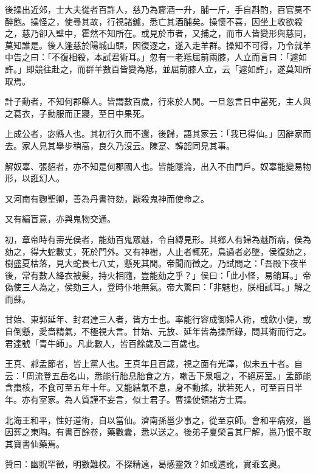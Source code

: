 \begin{pinyinscope}
後操出近郊，士大夫從者百許人，慈乃為齎酒一升，脯一斤，手自斟酌，百官莫不醉飽。操怪之，使尋其故，行視諸鑪，悉亡其酒脯矣。操懷不喜，因坐上收欲殺之，慈乃卻入壁中，霍然不知所在。或見於市者，又捕之，而市人皆變形與慈同，莫知誰是。後人逢慈於陽城山頭，因復逐之，遂入走羊群。操知不可得，乃令就羊中告之曰：「不復相殺，本試君術耳。」忽有一老羝屈前兩膝，人立而言曰：「遽如許。」即競往赴之，而群羊數百皆變為羝，並屈前膝人立，云「遽如許」，遂莫知所取焉。

計子勳者，不知何郡縣人。皆謂數百歲，行來於人閒。一旦忽言日中當死，主人與之葛衣，子勳服而正寢，至日中果死。

上成公者，宓縣人也。其初行久而不還，後歸，語其家云：「我已得仙。」因辭家而去。家人見其舉步稍高，良久乃沒云。陳寔、韓韶同見其事。

解奴辜、張貂者，亦不知是何郡國人也。皆能隱淪，出入不由門戶。奴辜能變易物形，以誑幻人。

又河南有麴聖卿，善為丹書符劾，厭殺鬼神而使命之。

又有編盲意，亦與鬼物交通。

初，章帝時有壽光侯者，能劾百鬼眾魅，令自縛見形。其鄉人有婦為魅所病，侯為劾之，得大蛇數丈，死於門外。又有神樹，人止者輒死，鳥過者必墜，侯復劾之，樹盛夏枯落，見大蛇長七八丈，懸死其閒。帝聞而徵之。乃試問之：「吾殿下夜半後，常有數人絳衣被髮，持火相隨，豈能劾之乎？」侯曰：「此小怪，易銷耳。」帝偽使三人為之，侯劾三人，登時仆地無氣。帝大驚曰：「非魅也，朕相試耳。」解之而蘇。

甘始、東郭延年、封君達三人者，皆方士也。率能行容成御婦人術，或飲小便，或自倒懸，愛嗇精氣，不極視大言。甘始、元放、延年皆為操所錄，問其術而行之。君達號「青牛師」。凡此數人，皆百餘歲及二百歲也。

王真、郝孟節者，皆上黨人也。王真年且百歲，視之面有光澤，似未五十者。自云：「周流登五岳名山，悉能行胎息胎食之方，嗽舌下泉咽之，不絕房室。」孟節能含棗核，不食可至五年十年。又能結氣不息，身不動搖，狀若死人，可至百日半年。亦有室家。為人質謹不妄言，似士君子。曹操使領諸方士焉。

北海王和平，性好道術，自以當仙。濟南孫邕少事之，從至京師。會和平病歿，邕因葬之東陶。有書百餘卷，藥數囊，悉以送之。後弟子夏榮言其尸解，邕乃恨不取其寶書仙藥焉。

贊曰：幽貺罕徵，明數難校。不探精遠，曷感靈效？如或遷訛，實乖玄奧。


\end{pinyinscope}